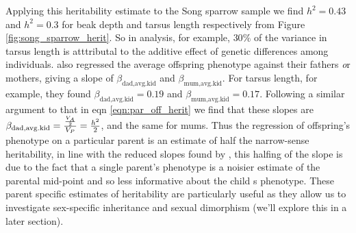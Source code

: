 Applying this heritability estimate to the Song sparrow sample we find
$h^2=0.43$ and $h^2=0.3$ for beak depth and tarsus length
respectively from Figure
\ref{fig:song_sparrow_herit}. So in \citet{smith1979heritability} analysis, for example,
$30\%$ of the variance in tarsus length is atttributal to the additive
effect of genetic
differences among individuals. 
\citet{smith1979heritability} also regressed the average offspring
phenotype against their fathers {\emph or} mothers,
giving a slope of $\beta_{\textrm{dad}, \textrm{avg.kid}}$ and
$\beta_{\textrm{mum}, \textrm{avg.kid}}$. For tarsus length, for
example, they found $\beta_{\textrm{dad},
  \textrm{avg.kid}}= 0.19$ and $\beta_{\textrm{mum},
  \textrm{avg.kid}}= 0.17$.  Following a similar argument to
that in eqn
\eqref{eqn:par_off_herit} we find that these slopes are $\beta_{\textrm{dad}, \textrm{avg.kid}}=
\nicefrac{\nicefrac{V_{A}}{2}}{V_P} = \nicefrac{h^2}{2}$, and the same
  for mums. Thus the regression of offspring's phenotype on a
  particular parent is an estimate of half the narrow-sense
  heritability, in line with the reduced slopes found by
  \citet{smith1979heritability}, this halfing of the slope is due to the
  fact that a single parent's phenotype is a noisier estimate of the
  parental mid-point and so less informative about the child
  s phenotype. These parent specific estimates of heritability are
  particularly useful as they allow us to investigate sex-specific inheritance and sexual
  dimorphism (we'll explore this in a later section). 


